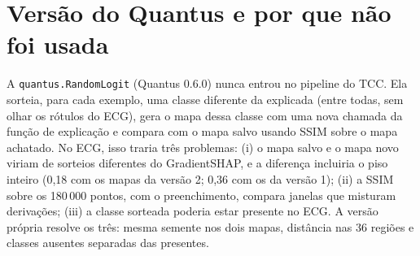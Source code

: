 \documentclass[11pt,a4paper]{article}
\begin{document}
\section{Versão do Quantus e por que não foi usada}
A \texttt{quantus.RandomLogit} (Quantus 0.6.0) nunca entrou no pipeline do TCC. Ela sorteia, para cada exemplo, uma classe diferente da explicada (entre todas, sem olhar os rótulos do ECG), gera o mapa dessa classe com uma nova chamada da função de explicação e compara com o mapa salvo usando SSIM sobre o mapa achatado. No ECG, isso traria três problemas: (i) o mapa salvo e o mapa novo viriam de sorteios diferentes do GradientSHAP, e a diferença incluiria o piso inteiro (0,18 com os mapas da versão 2; 0,36 com os da versão 1); (ii) a SSIM sobre os 180\,000 pontos, com o preenchimento, compara janelas que misturam derivações; (iii) a classe sorteada poderia estar presente no ECG. A versão própria resolve os três: mesma semente nos dois mapas, distância nas 36 regiões e classes ausentes separadas das presentes.
\end{document}
